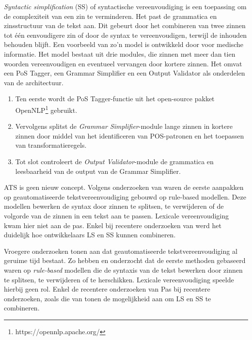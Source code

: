 \medspace

\textit{Syntactic simplification} (SS) of syntactische vereenvoudiging is een toepassing om de complexiteit van een zin te verminderen. Het past de grammatica en zinsstructuur van de tekst aan. Dit gebeurt door het combineren van twee zinnen tot één eenvoudigere zin of door de syntax te vereenvoudigen, terwijl de inhouden behouden blijft. Een voorbeeld van zo'n model is ontwikkeld door \textcite{Kandula2010} voor medische informatie. Het model bestaat uit drie modules, die zinnen met meer dan tien woorden vereenvoudigen en eventueel vervangen door kortere zinnen. Het omvat een PoS Tagger, een Grammar Simplifier en een Output Validator als onderdelen van de architectuur.

\medspace

\begin{enumerate}
	\item Ten eerste wordt de PoS Tagger-functie uit het open-source pakket OpenNLP\footnote{https://opennlp.apache.org/} gebruikt.
	\item Vervolgens splitst de \textit{Grammar Simplifier}-module lange zinnen in kortere zinnen door middel van het identificeren van POS-patronen en het toepassen van transformatieregels.
	\item Tot slot controleert de \textit{Output Validator}-module de grammatica en leesbaarheid van de output van de Grammar Simplifier.
\end{enumerate}  

\medspace

ATS is geen nieuw concept. Volgens onderzoeken van \textcite{Canning2000, Siddharthan2006} waren de eerste aanpakken op geautomatiseerde tekstvereenvoudiging gebouwd op rule-based modellen. Deze modellen bewerken de syntax door zinnen te splitsen, te verwijderen of de volgorde van de zinnen in een tekst aan te passen. Lexicale vereenvoudiging kwam hier niet aan de pas. Enkel bij recentere onderzoeken van \textcite{Coster2011, Bulte2018} werd het duidelijk hoe ontwikkelaars LS en SS kunnen combineren.

\medspace

Vroegere onderzoeken tonen aan dat geautomatiseerde tekstvereenvoudiging al geruime tijd bestaat. Zo hebben \textcite{Canning2000} en \textcite{Siddharthan2006} onderzocht dat de eerste methoden gebaseerd waren op \textit{rule-based} modellen die de syntaxis van de tekst bewerken door zinnen te splitsen, te verwijderen of te herschikken. Lexicale vereenvoudiging speelde hierbij geen rol. Enkel de recentere onderzoeken van  Pas bij recentere onderzoeken, zoals die van \textcite{Coster2011, Bulte2018} tonen de mogelijkheid aan om LS en SS te combineren.

